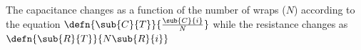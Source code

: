 \documentclass[12pt]{article}
\begin{document}


\par The capacitance changes as a function of the number of wraps ($N$) according to the equation  $\defn{\sub{C}{T}}{\frac{\sub{C}{i}}{N}}$ while the resistance changes as $\defn{\sub{R}{T}}{N \sub{R}{i}}$
\end{document}
